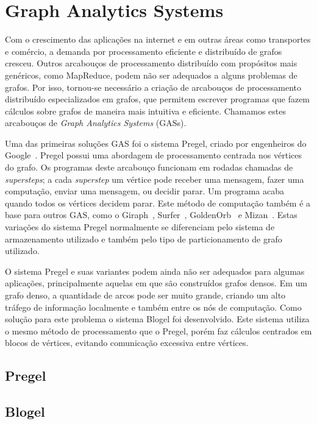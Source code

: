 \documentclass[conference]{IEEEtran}
\begin{document}
\section{Graph Analytics Systems}
Com o crescimento das aplicações na internet e em outras áreas como 
transportes e comércio, a demanda por processamento eficiente e 
distribuído de grafos cresceu. Outros arcabouços de processamento 
distribuído com propósitos mais genéricos, como MapReduce, podem não ser
adequados a alguns problemas de grafos. Por isso, tornou-se necessário a
criação de arcabouços de processamento distribuído especializados em 
grafos, que permitem escrever programas que fazem cálculos sobre grafos
de maneira mais intuitiva e eficiente. Chamamos estes arcabouços de 
{\em Graph Analytics Systems} (GASs).

Uma das primeiras soluções GAS foi o sistema Pregel, criado por 
engenheiros do Google~\cite{pregel}. Pregel possui uma abordagem de 
processamento centrada nos vértices do grafo. Os programas deste 
arcabouço funcionam em rodadas chamadas de {\em supersteps}; a cada 
{\em superstep} um vértice pode receber uma mensagem, fazer uma 
computação, enviar uma mensagem, ou decidir parar. Um programa acaba 
quando todos os vértices decidem parar. Este método de computação também 
é a base para outros GAS, como o Giraph~\cite{giraph}, 
Surfer~\cite{surfer}, GoldenOrb~\cite{goldenorb} e Mizan~\cite{mizan}. 
Estas variações do sistema Pregel normalmente se diferenciam pelo 
sistema de armazenamento utilizado e também pelo tipo de particionamento
de grafo utilizado.

O sistema Pregel e suas variantes podem ainda não ser adequados para 
algumas aplicações, principalmente aquelas em que são construídos grafos
densos. Em um grafo denso, a quantidade de arcos pode ser muito grande, 
criando um alto tráfego de informação localmente e também entre os nós
de computação. Como solução para este problema o sistema Blogel foi 
desenvolvido. Este sistema utiliza o mesmo método de processamento que o
Pregel, porém faz cálculos centrados em blocos de vértices, evitando
comunicação excessiva entre vértices.

\subsection{Pregel}


\subsection{Blogel}
\end{document}

